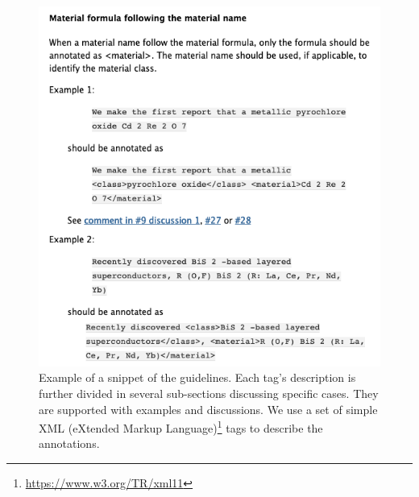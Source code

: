 \documentclass[fleqn,10pt]{wlscirep}
\begin{document}
\begin{figure}[htb]
    \centering
    \includegraphics[width=0.9\linewidth]{example-guidelines-1b.png}
    \caption{Example of a snippet of the guidelines. Each tag's description is further divided in several sub-sections discussing specific cases. They are supported with examples and discussions. We use a set of simple XML (eXtended Markup Language)\protect\footnote{\protect\url{https://www.w3.org/TR/xml11}} tags to describe the annotations.}
    \label{fig:guidelines-example}
\end{figure}
\end{document}
